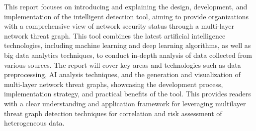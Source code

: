 This report focuses on introducing and explaining the design, development, and implementation of the intelligent detection tool, aiming to provide organizations with a comprehensive view of network security status through a multi-layer network threat graph. This tool combines the latest artificial intelligence technologies, including machine learning and deep learning algorithms, as well as big data analytics techniques, to conduct in-depth analysis of data collected from various sources. The report will cover key areas and technologies such as data preprocessing, AI analysis techniques, and the generation and visualization of multi-layer network threat graphs, showcasing the development process, implementation strategy, and practical benefits of the tool. This provides readers with a clear understanding and application framework for leveraging multilayer threat graph detection techniques for correlation and risk assessment of heterogeneous data.
